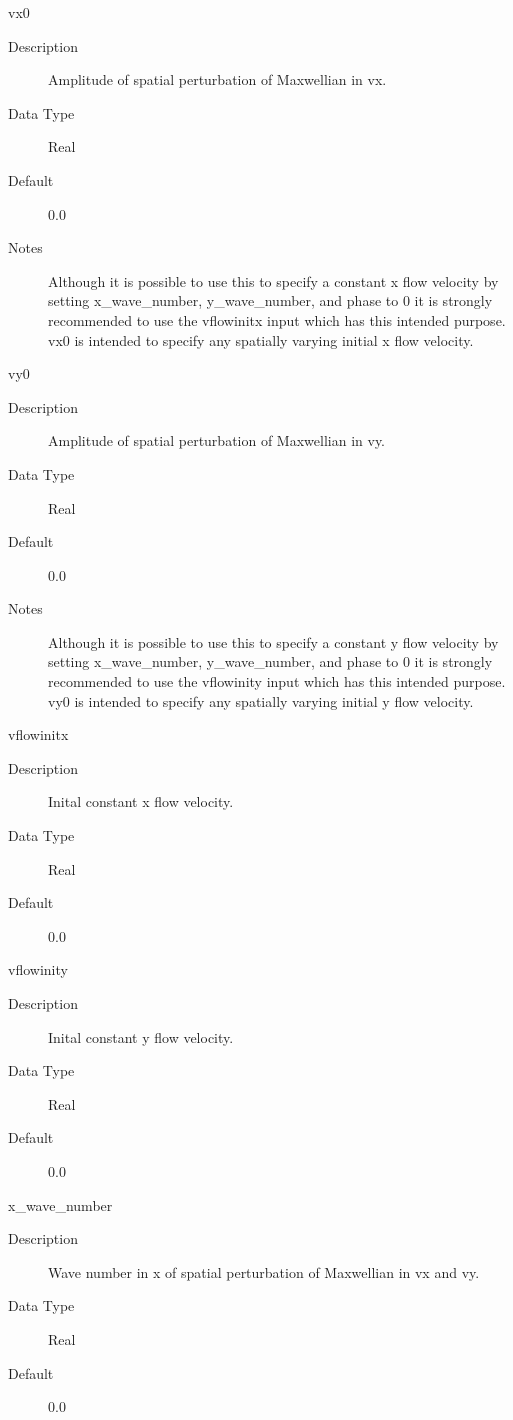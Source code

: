 \documentclass[11pt]{amsart}
\begin{document}
vx0
\begin{description}
\item [Description] Amplitude of spatial perturbation of Maxwellian in vx.
\item [Data Type] Real
\item [Default] 0.0
\item [Notes] Although it is possible to use this to specify a constant x flow
velocity by setting x\_wave\_number, y\_wave\_number, and phase to 0 it is
strongly recommended to use the vflowinitx input which has this intended
purpose.  vx0 is intended to specify any spatially varying initial x flow
velocity.
\end{description}

vy0
\begin{description}
\item [Description] Amplitude of spatial perturbation of Maxwellian in vy.
\item [Data Type] Real
\item [Default] 0.0
\item [Notes] Although it is possible to use this to specify a constant y flow
velocity by setting x\_wave\_number, y\_wave\_number, and phase to 0 it is
strongly recommended to use the vflowinity input which has this intended
purpose.  vy0 is intended to specify any spatially varying initial y flow
velocity.
\end{description}

vflowinitx
\begin{description}
\item [Description] Inital constant x flow velocity.
\item [Data Type] Real
\item [Default] 0.0
\end{description}

vflowinity
\begin{description}
\item [Description] Inital constant y flow velocity.
\item [Data Type] Real
\item [Default] 0.0
\end{description}

x\_wave\_number
\begin{description}
\item [Description] Wave number in x of spatial perturbation of Maxwellian in
vx and vy.
\item [Data Type] Real
\item [Default] 0.0
\end{description}
\end{document}
